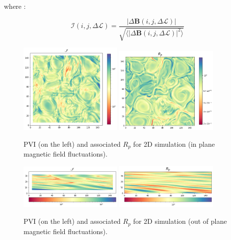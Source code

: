 \documentclass[column]{aastex62}
\begin{document}
            where :

            \begin{equation} \label{eqn:pvi2}
		        \mathcal{I}(i, j, \Delta \mathcal{L}) = \frac{|\Delta \mathbf{B}(i, j, \Delta \mathcal{L})|}{\sqrt{\langle |\Delta \mathbf{B}(i, j, \Delta \mathcal{L})|^2 \rangle}}
		    \end{equation}

		\begin{figure}
			\begin{center}
				\includegraphics[width=0.45\textwidth]{pvi_2dpp.png}
				\includegraphics[width=0.45\textwidth]{rp_2dpp.png}
				\caption{PVI (on the left) and associated $R_p$ for 2D simulation (in plane magnetic field fluctuations).}
				\label{fig:pvi2dpp}
			\end{center}
		\end{figure}

		\begin{figure}
			\begin{center}
				\includegraphics[width=0.45\textwidth]{pvi_2dip.png}
				\includegraphics[width=0.45\textwidth]{rp_2dip.png}
				\caption{PVI (on the left) and associated $R_p$ for 2D simulation (out of plane magnetic field fluctuations).}
				\label{fig:fig:pvi2dip}
			\end{center}
		\end{figure}

\clearpage
%



\end{document}

